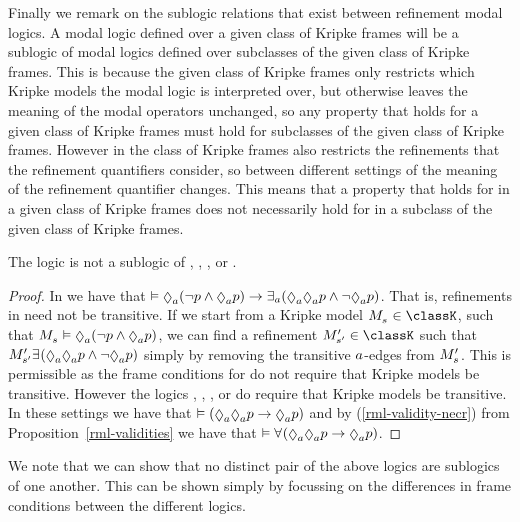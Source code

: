 Finally we remark on the sublogic relations that exist between refinement modal logics.
A modal logic defined over a given class of Kripke frames will be a sublogic of modal logics defined over subclasses of the given class of Kripke frames.
This is because the given class of Kripke frames only restricts which Kripke models the modal logic is interpreted over, but otherwise leaves the meaning of the modal operators unchanged, so any property that holds for a given class of Kripke frames must hold for subclasses of the given class of Kripke frames.
However in \logicRml{} the class of Kripke frames also restricts the refinements that the refinement quantifiers consider, so between different settings of \logicRml{} the meaning of the refinement quantifier changes.
This means that a property that holds for \logicRml{} in a given class of Kripke frames does not necessarily hold for \logicRml{} in a subclass of the given class of Kripke frames.

\begin{proposition}\label{rml-not-sublogics}
The logic \logicRmlK{} is not a sublogic of \logicRmlKF{}, \logicRmlKFF{}, \logicRmlKD{}, or \logicRmlS{}.
\end{proposition}

\begin{proof}
In \logicRmlK{} we have that $\entails \possibleA (\lnot \atomP \land \possibleA \atomP) \implies \somerefsA (\possibleA \possibleA \atomP \land \lnot \possibleA \atomP)$.
That is, refinements in \logicRmlK{} need not be transitive.
If we start from a Kripke model $\kPModel{\kStateS} \in \classK$, such that $\kPModel{\kStateS} \entails \possibleA (\lnot \atomP \land \possibleA \atomP)$, we can find a refinement $\kPModelP{\kStateSP} \in \classK$ such that 
$\kPModelP{\kStateSP} \somerefs (\possibleA \possibleA \atomP \land \lnot \possibleA \atomP)$ simply by removing the transitive $a$-edges from $\kPModelP{\kStateS}$.
This is permissible as the frame conditions for \classK{} do not require that Kripke models be transitive.
However the logics \logicRmlKF{}, \logicRmlKFF{}, \logicRmlKD{}, or \logicRmlS{} do require that Kripke models be transitive.
In these settings we have that $\entails (\possibleA \possibleA \atomP \implies \possibleA \atomP)$ and by (\ref{rml-validity-necr}) from Proposition~\ref{rml-validities} we have that $\entails \allrefs (\possibleA \possibleA \atomP \implies \possibleA \atomP)$.
\end{proof}

We note that we can show that no distinct pair of the above logics are sublogics of one another.
This can be shown simply by focussing on the differences in frame conditions between the different logics.

